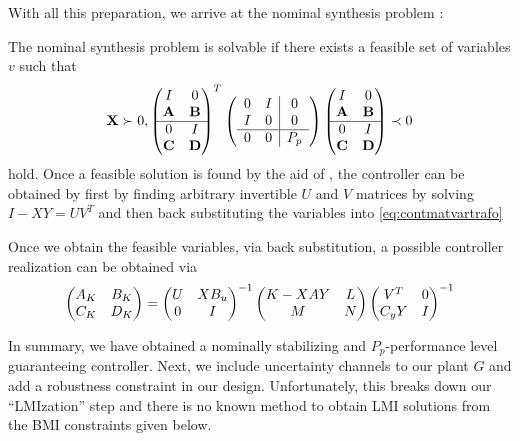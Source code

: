 With all this preparation, we arrive at the nominal synthesis problem : 
\begin{thm}\label{thm:nomsynthLMI} The nominal synthesis problem is solvable if there exists a feasible set of 
variables $v$ such that
\begin{equation}
\mathbf{X}\succ 0,\begin{pmatrix}I&0\\\mathbf{A}&\mathbf{B}\\\hline 0&I\\\mathbf{C}&\mathbf{D}\end{pmatrix}^T
\left(
\begin{array}{cc|c}
	0&I&0\\I&0&0\\\hline 0&0&P_p
\end{array}
\right)
\begin{pmatrix}I&0\\\mathbf{A}&\mathbf{B}\\\hline 0&I\\\mathbf{C}&\mathbf{D}\end{pmatrix} \prec 0
\label{eq:nomsynthLMI}
\end{equation}
hold. Once a feasible solution is found by the aid of , the controller can be obtained by first by finding arbitrary 
invertible $U$ and $V$ matrices by solving $I-XY= UV^T$ and then back substituting the variables into \eqref{eq:contmatvartrafo}
\end{thm}
Once we obtain the feasible variables, via back substitution, a possible controller realization can be obtained via 
\begin{equation}
\begin{pmatrix}A_K  & B_K \\C_K  & D_K\end{pmatrix} = \begin{pmatrix}U&XB_u\\0&I\end{pmatrix}^{-1}\begin{pmatrix}K-XAY&L\\M&N\end{pmatrix} 
\begin{pmatrix}V^T&0\\C_yY&I\end{pmatrix}^{-1}
\label{eq:contmatvarbacktrafo}
\end{equation}

In summary, we have obtained a nominally stabilizing and $P_p$-performance level guaranteeing controller. Next, we include 
uncertainty channels to our plant $G$ and add a robustness constraint in our design. Unfortunately, this breaks down our
\enquote{LMIzation} step and there is no known method to obtain LMI solutions from the BMI constraints given below.

